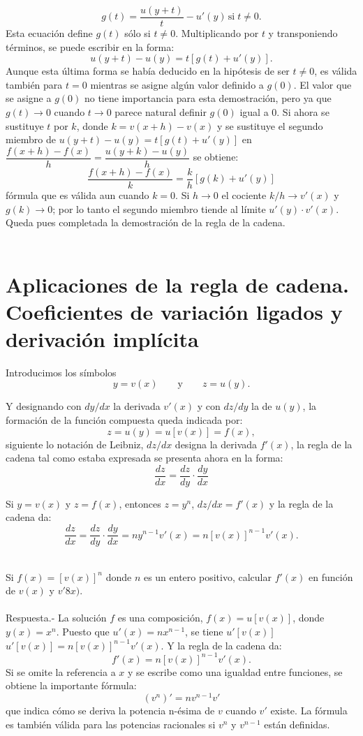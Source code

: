 \begin{teo}
	$$g(t)=\dfrac{u(y+t)}{t}-u'(y)\, \mbox{si}\; t\neq 0.$$
	Esta ecuación define $g(t)$ sólo si $t\neq 0$. Multiplicando por $t$ y transponiendo términos, se puede escribir en la forma:
	$$u(y+t)-u(y)=t[g(t)+u'(y)].$$
	Aunque esta última forma se había deducido en la hipótesis de ser $t\neq 0$, es válida también para $t=0$ mientras se asigne algún valor definido a $g(0)$. El valor que se asigne a $g(0)$ no tiene importancia para esta demostración, pero ya que $g(t)\to 0$ cuando $t\to 0$ parece natural definir $g(0)$ igual a $0$. Si ahora se sustituye $t$ por $k$, donde $k=v(x+h)-v(x)$ y se sustituye el segundo miembro de $u(y+t)-u(y)=t[g(t)+u'(y)]$ en $\dfrac{f(x+h)-f(x)}{h}=\dfrac{u(y+k)-u(y)}{h}$ se obtiene:
	$$\dfrac{f(x+h)-f(x)}{k}=\dfrac{k}{h}[g(k)+u'(y)]$$
	fórmula que es válida aun cuando $k=0$. Si $h\to 0$ el cociente $k/h\to v'(x)$ y $g(k)\to 0$; por lo tanto el segundo miembro tiende al límite $u'(y)\cdot v'(x).$ Queda pues completada la demostración de la regla de la cadena.\\\\
\end{teo}

\section{Aplicaciones de la regla de cadena. Coeficientes de variación ligados y derivación implícita}

Introducimos los símbolos $$y=v(x)\qquad \mbox{y}\qquad z=u(y).$$

Y designando con $dy/dx$ la derivada $v'(x)$ y con $dz/dy$ la de $u(y)$, la formación de la función compuesta queda indicada por:
$$z=u(y)=u[v(x)]=f(x),$$
siguiente lo notación de Leibniz, $dz/dx$ designa la derivada $f'(x)$, la regla de la cadena tal como estaba expresada se presenta ahora en la forma:
$$\dfrac{dz}{dx}=\dfrac{dz}{dy}\cdot \dfrac{dy}{dx}$$

Si $y=v(x)$ y $z=f(x)$, entonces $z=y^n$, $dz/dx=f'(x)$ y la regla de la cadena da:
$$\dfrac{dz}{dx}=\dfrac{dz}{dy}\cdot \dfrac{dy}{dx}=ny^{n-1}v'(x)=n[v(x)]^{n-1}v'(x).$$\\

\begin{ejem}
    Si $f(x)=[v(x)]^n$ donde $n$ es un entero positivo, calcular $f'(x)$ en función de $v(x)$ y $v'8x)$. \\\\
	Respuesta.-\; La solución $f$ es una composición, $f(x)=u[v(x)]$, donde $y(x)=x^n$. Puesto que $u'(x)=nx^{n-1}$, se tiene $u'[v(x)]$ $u'[v(x)]=n[v(x)]^{n-1}v'(x).$ Y la regla de la cadena da:
	$$f'(x)=n[v(x)]^{n-1}v'(x).$$
	Si se omite la referencia a $x$ y se escribe como una igualdad entre funciones, se obtiene la importante fórmula:
	$$(v^n)'=nv^{n-1}v'$$
	que indica cómo se deriva la potencia n-ésima de $v$ cuando $v'$ existe. La fórmula es también válida para las potencias racionales si $v^n$ y $v^{n-1}$ están definidas.\\\\
\end{ejem}


